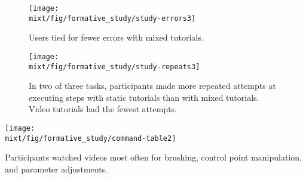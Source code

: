 \begin{figure*}[t]
  \centering
  \texttt{[image: \\mixt/fig/formative\_study/study-errors3]}
  \caption{Users tied for fewer errors with mixed tutorials.}
  \label{fig:formative_errors}
\end{figure*}

\begin{figure*}[t]
  \centering
  \texttt{[image: \\mixt/fig/formative\_study/study-repeats3]}
  \caption{In two of three tasks, participants made more repeated attempts at executing steps with static tutorials than with mixed tutorials. Video tutorials had the fewest attempts.}
  \label{fig:formative_attempts}
\end{figure*}

\begin{table}
  \centering
  \texttt{[image: \\mixt/fig/formative\_study/command-table2]}
  \caption{Participants watched videos most often for brushing, control point manipulation, and parameter adjustments.}
  \label{tab:formative_video_views}
\end{table}
